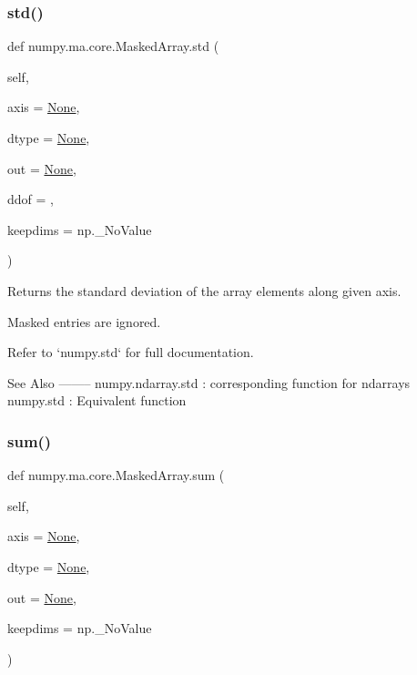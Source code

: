 \subsubsection{\texorpdfstring{std()}{std()}}
{\footnotesize\ttfamily def numpy.\+ma.\+core.\+Masked\+Array.\+std (\begin{DoxyParamCaption}\item[{}]{self,  }\item[{}]{axis = {\ttfamily \hyperlink{namespacenumpy_1_1ma_1_1core_a647ee1848dfa3692fe35a663a2aa40b3}{None}},  }\item[{}]{dtype = {\ttfamily \hyperlink{namespacenumpy_1_1ma_1_1core_a647ee1848dfa3692fe35a663a2aa40b3}{None}},  }\item[{}]{out = {\ttfamily \hyperlink{namespacenumpy_1_1ma_1_1core_a647ee1848dfa3692fe35a663a2aa40b3}{None}},  }\item[{}]{ddof = {},  }\item[{}]{keepdims = {\ttfamily np.\+\_\+NoValue} }\end{DoxyParamCaption})}

\begin{DoxyVerb}Returns the standard deviation of the array elements along given axis.

Masked entries are ignored.

Refer to `numpy.std` for full documentation.

See Also
--------
numpy.ndarray.std : corresponding function for ndarrays
numpy.std : Equivalent function
\end{DoxyVerb}
 \mbox{\label{classnumpy_1_1ma_1_1core_1_1MaskedArray_ac2711ac7b9660a343b008adb674cbb39}} 
\subsubsection{\texorpdfstring{sum()}{sum()}}
{\footnotesize\ttfamily def numpy.\+ma.\+core.\+Masked\+Array.\+sum (\begin{DoxyParamCaption}\item[{}]{self,  }\item[{}]{axis = {\ttfamily \hyperlink{namespacenumpy_1_1ma_1_1core_a647ee1848dfa3692fe35a663a2aa40b3}{None}},  }\item[{}]{dtype = {\ttfamily \hyperlink{namespacenumpy_1_1ma_1_1core_a647ee1848dfa3692fe35a663a2aa40b3}{None}},  }\item[{}]{out = {\ttfamily \hyperlink{namespacenumpy_1_1ma_1_1core_a647ee1848dfa3692fe35a663a2aa40b3}{None}},  }\item[{}]{keepdims = {\ttfamily np.\+\_\+NoValue} }\end{DoxyParamCaption})}


